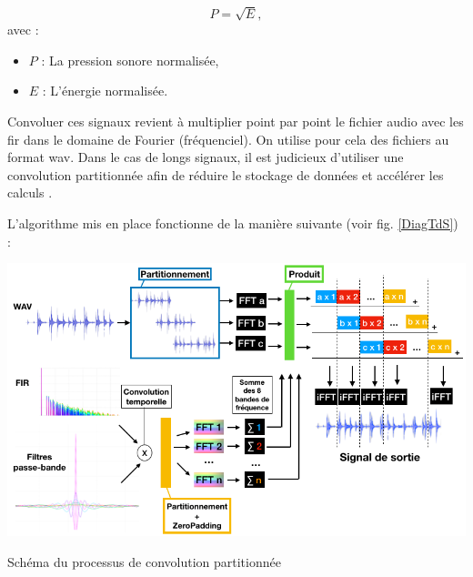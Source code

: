 \begin{equation}
P = \sqrt{E},
\end{equation}
avec : 
\begin{itemize}
\item $P$ : La pression sonore normalisée,
\item $E$ : L'énergie normalisée.
\end{itemize}

Convoluer ces signaux revient à multiplier point par point le fichier audio avec les \gls{fir} dans le domaine de Fourier (fréquenciel).
On utilise pour cela des fichiers au format \gls{wav}. Dans le cas de longs signaux, il est judicieux d'utiliser une convolution partitionnée afin de réduire le stockage de données et accélérer les calculs \cite[2. Algorithm overview ]{partition}. 

L'algorithme mis en place fonctionne de la manière suivante (voir fig. \ref{DiagTdS}) :
\begin{figureth}
	\includegraphics[width=\linewidth]{images/DiagTdS}
	\caption{Schéma du processus de convolution partitionnée}
	\label{DiagTdS}
\end{figureth}

